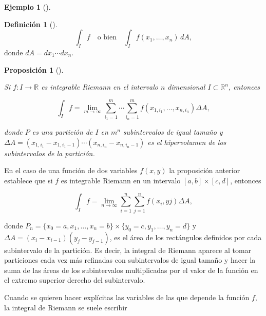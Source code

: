 \documentclass[
  a4paper,
]{scrreport}
\theoremstyle{definition}
\newtheorem{example}{Ejemplo}[chapter]
\theoremstyle{plain}
\theoremstyle{definition}
\newtheorem{definition}{Definición}[chapter]
\theoremstyle{definition}
\theoremstyle{plain}
\theoremstyle{plain}
\newtheorem{proposition}{Proposición}[chapter]
\theoremstyle{remark}
\begin{document}
\begin{example}[]
\begin{definition}[]
\[
\int_I f \quad \mbox{o bien} \quad \int_I f(x_1,\ldots,x_n)\,dA,
\] donde \(dA = dx_1\cdots dx_n\).

\end{definition}

\begin{proposition}[]\protect\hypertarget{prp-integral-riemann-n-dimensional}{}\label{prp-integral-riemann-n-dimensional}

Si \(f:I\to \mathbb{R}\) es integrable Riemann en el intervalo \(n\)
dimensional \(I\subset \mathbb{R}^n\), entonces

\[
\int_I f = \lim_{m\to \infty} \sum_{i_1=1}^m\cdots \sum_{i_n=1}^m f(x_{1,i_1},\ldots, x_{n,i_n})\Delta A,
\]

donde \(P\) es una partición de \(I\) en \(m^n\) subintervalos de igual
tamaño y
\(\Delta A = (x_{1,i_1}-x_{1,i_1-1})\cdots (x_{n,i_n}-x_{n,i_n-1})\) es
el hipervolumen de los subintervalos de la partición.

\end{proposition}

En el caso de una función de dos variables \(f(x,y)\) la proposición
anterior establece que si \(f\) es integrable Riemann en un intervalo
\([a,b]\times [c,d]\), entonces

\[
\int_I f = \lim_{n\to \infty}\sum_{i=1}^n\sum_{j=1}^n f(x_i, yj)\Delta A,
\]

donde
\(P_n = \{x_0=a,x_1,\ldots,x_n=b\}\times \{y_0=c,y_1,\ldots,y_n=d\}\) y
\(\Delta A = (x_i-x_{i-1})(y_j-y_{j-1})\), es el área de los rectángulos
definidos por cada subintervalo de la partición. Es decir, la integral
de Riemann aparece al tomar particiones cada vez más refinadas con
subintervalos de igual tamaño y hacer la suma de las áreas de los
subintervalos multiplicadas por el valor de la función en el extremo
superior derecho del subintervalo.

\begin{tcolorbox}[enhanced jigsaw, leftrule=.75mm, colbacktitle=quarto-callout-note-color!10!white, toprule=.15mm, opacityback=0, opacitybacktitle=0.6, toptitle=1mm, breakable, bottomtitle=1mm, colframe=quarto-callout-note-color-frame, rightrule=.15mm, titlerule=0mm, title=\textcolor{quarto-callout-note-color}{\faInfo}\hspace{0.5em}{Nota}, arc=.35mm, left=2mm, bottomrule=.15mm, colback=white, coltitle=black]

Cuando se quieren hacer explícitas las variables de las que depende la
función \(f\), la integral de Riemann se suele escribir


\end{tcolorbox}
\end{example}
\end{document}
